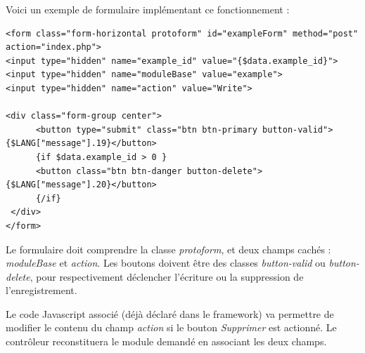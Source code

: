 Voici un exemple de formulaire implémentant ce fonctionnement :

\begin{lstlisting}
<form class="form-horizontal protoform" id="exampleForm" method="post" action="index.php">
<input type="hidden" name="example_id" value="{$data.example_id}">
<input type="hidden" name="moduleBase" value="example">
<input type="hidden" name="action" value="Write">

<div class="form-group center">
      <button type="submit" class="btn btn-primary button-valid">{$LANG["message"].19}</button>
      {if $data.example_id > 0 }
      <button class="btn btn-danger button-delete">{$LANG["message"].20}</button>
      {/if}
 </div>
</form>
\end{lstlisting}

Le formulaire doit comprendre la classe \textit{protoform}, et deux champs cachés : \textit{moduleBase} et \textit{action}. Les boutons doivent être des classes \textit{button-valid} ou \textit{button-delete}, pour respectivement déclencher l'écriture ou la suppression de l'enregistrement.

Le code Javascript associé (déjà déclaré dans le framework) va permettre de modifier le contenu du champ \textit{action} si le bouton \textit{Supprimer} est actionné. Le contrôleur reconstituera le module demandé en associant les deux champs.